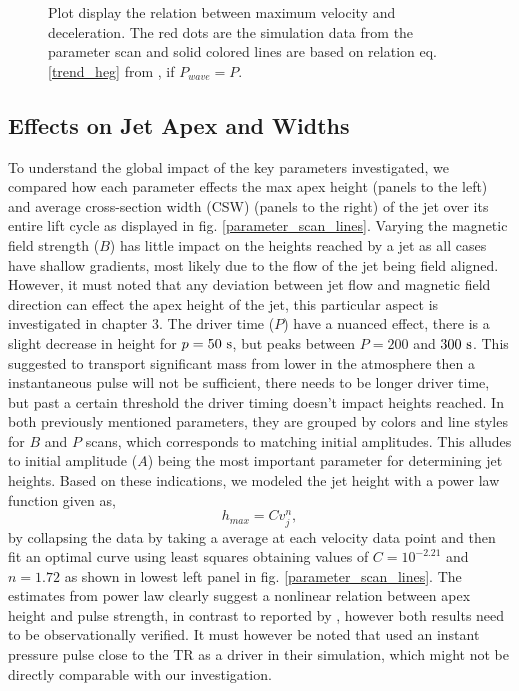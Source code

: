 \documentclass[12pt]{ociamthesis}
\newcommand{\fref}[1]{fig. \ref{#1}}
\newcommand{\np}{\\ \\}
\begin{document}
\begin{figure}
\captionsetup[subfigure]{labelformat=empty}
\centering
{} 
\caption{Plot display the relation between maximum velocity and deceleration. The red dots are the simulation data from the parameter scan and solid colored lines are based on relation eq. \eqref{trend_heg} from \cite{Heggland2007ApJ6661277H}, if $P_{wave}=P$.}
\label{decell}
\end{figure}
\subsection{Effects on Jet Apex and Widths}
\label{subsec:jet_apex_widths}
To understand the global impact of the key parameters investigated, we compared how each parameter effects the max apex height (panels to the left) and average cross-section width (CSW) (panels to the right) of the jet over its entire lift cycle as displayed in \fref{parameter_scan_lines}. Varying the magnetic field strength ($B$) has little impact on the heights reached by a jet as all cases have shallow gradients, most likely due to the flow of the jet being field aligned. However, it must noted that any deviation between jet flow and magnetic field direction can effect the apex height of the jet, this particular aspect is investigated in chapter 3. The driver time ($P$) have a nuanced effect, there is a slight decrease in height for $p=50~\rm{s}$, but peaks between $P=200$ and $300~\rm{s}$. This suggested to transport significant mass from lower in the atmosphere then a instantaneous pulse will not be sufficient, there needs to be longer driver time, but past a certain threshold the driver timing doesn't impact heights reached. In both previously mentioned parameters, they are grouped by colors and line styles for $B$ and $P$ scans, which corresponds to matching initial amplitudes. This alludes to initial amplitude ($A$) being the most important parameter for determining jet heights. Based on these indications, we modeled the jet height with a power law function given as,   
\begin{equation}
h_{max} = C v_j^{n},
\end{equation} 
by collapsing the data by taking a average at each velocity data point and then fit an optimal curve using least squares obtaining values of $C= 10^{-2.21}$ and $n= 1.72$ as shown in lowest left panel in \fref{parameter_scan_lines}. The estimates from power law clearly suggest a nonlinear relation between apex height and pulse strength, in contrast to reported by \citet{Singh2019}, however both results need to be observationally verified. It must however be noted that \citet{Singh2019} used an instant pressure pulse close to the TR as a driver in their simulation, which might not be directly comparable with our investigation. \np  
\end{document}
